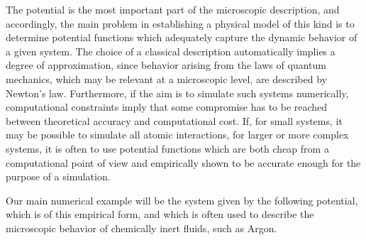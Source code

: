 The potential is the most important part of the microscopic description, and accordingly, the main problem in establishing a physical model of this kind is to determine potential functions which adequately capture the dynamic behavior of a given system. 
The choice of a classical description automatically implies a degree of approximation, since behavior arising from the laws of quantum mechanics, which may be relevant at a microscopic level, are described by Newton's law.
 Furthermore, if the aim is to simulate such systems numerically, computational constraints imply that some compromise has to be reached between theoretical accuracy and computational cost. 
 If, for small systems, it may be possible to simulate all atomic interactions, for larger or more complex systems, it is often to use potential functions which are both cheap from a computational point of view and empirically shown to be accurate enough for the purpose of a simulation.
 
 Our main numerical example will be the system given by the following potential, which is of this empirical form, and which is often used to describe the microscopic behavior of chemically inert fluids, such as Argon.


